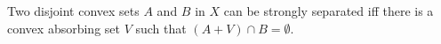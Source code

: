 Two disjoint convex sets $A$ and $B$ in $X$ can be strongly separated iff there is a convex absorbing set $V$ such that $(A+V)\cap B=\emptyset$.
